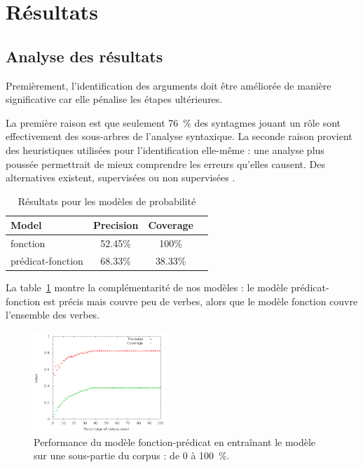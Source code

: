 \section{Résultats}

\subsection{Analyse des résultats}

Premièrement, l'identification des arguments doit être améliorée de manière
significative car elle pénalise les étapes ultérieures.

La première raison est que seulement 76~\% des syntagmes jouant un rôle sont
effectivement des sous-arbres de l'analyse syntaxique.
La seconde raison provient des heuristiques utilisées pour l'identification
elle-même : une analyse plus poussée permettrait de mieux comprendre les
erreurs qu'elles causent. Des alternatives existent, supervisées ou non
supervisées \citep{abend2009unsupervised}.

\begin{table}[ht]
    \centering
    \begin{tabular}{lccc}
        \toprule
        Model          & Precision & Coverage \\
        \midrule
        fonction           & 52.45\% & 100\% \\
        prédicat-fonction & 68.33\% & 38.33\% \\
        \bottomrule
    \end{tabular}
    \caption{\protect\centering\label{table:probabilisticresults}Résultats pour les modèles de probabilité}
\end{table}

La table~\ref{table:probabilisticresults} montre la complémentarité de nos
modèles : le modèle prédicat-fonction est précis mais couvre peu de verbes, alors
que le modèle fonction couvre l'ensemble des verbes.

\begin{figure}[t]
    \centering
    \includegraphics[width=0.45\textwidth]{fig/slot-predicate-percents.png}
    \caption{\label{fig:fonction_predicate}Performance du modèle fonction-prédicat en entraînant le modèle sur une sous-partie du corpus : de 0 à 100~\%.}
\end{figure}

